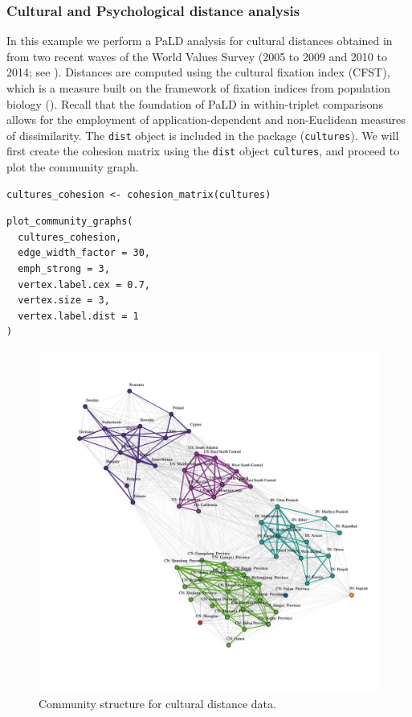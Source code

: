 \hypertarget{cultural-and-psychological-distance-analysis}{%
\subsubsection{Cultural and Psychological distance analysis}\label{cultural-and-psychological-distance-analysis}}

In this example we perform a PaLD analysis for cultural distances obtained in \citet{muthukrishna2020beyond} from two recent waves of the World Values Survey (2005 to 2009 and 2010 to 2014; see \citet{inglehart2014world}). Distances are
computed using the cultural fixation index (CFST), which is a measure built on the framework of fixation indices from population
biology (\citet{bell2009culture,cavalli1994history}). Recall that the foundation of PaLD in within-triplet comparisons allows for the employment of application-dependent and non-Euclidean measures of dissimilarity.
The \texttt{dist} object is
included in the  package (\texttt{cultures}). We will first create the cohesion matrix using the \texttt{dist} object \texttt{cultures}, and proceed to plot the community graph.

\begin{verbatim}
cultures_cohesion <- cohesion_matrix(cultures)
\end{verbatim}

\begin{verbatim}
plot_community_graphs(
  cultures_cohesion,
  edge_width_factor = 30,
  emph_strong = 3,
  vertex.label.cex = 0.7,
  vertex.size = 3,
  vertex.label.dist = 1
)
\end{verbatim}

\begin{figure}[H]
\centering
\includegraphics[width=5.4in,trim=1in 3in 1in 1in,clip]{fig7} \caption{Community structure for cultural distance data.}\label{fig:figculture}
\end{figure}

